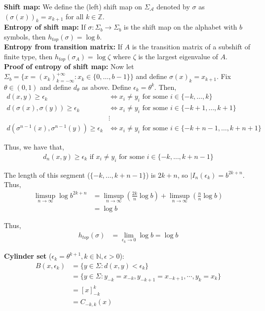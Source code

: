 \documentclass[12pt]{article}
\begin{document}
\textbf{Shift map:} We define the (left) shift map on $\Sigma_{\mathcal{A}}$ denoted by $\sigma$ as $(\sigma(x))_k = x_{k+1}$ for all $k \in \mathbb{Z}$.\\

\textbf{Entropy of shift map:} If $\sigma: \Sigma_b \to \Sigma_b$ is the shift map on the alphabet with $b$ symbols, then $h_{top}(\sigma) = \log b$.\\

\textbf{Entropy from transition matrix:} If $A$ is the transition matrix of a subshift of finite type, then $h_{top}(\sigma_A) = \log \zeta$ where $\zeta$ is the largest eigenvalue of $A$.\\

\textbf{Proof of entropy of shift map:} Now let $\Sigma_b = \{x = (x_k)_{k= -\infty}^{+ \infty} : x_k \in \{0, \ldots, b-1\}\}$ and define $\sigma(x)_k = x_{k+1}$. Fix $\theta \in (0, 1)$ and define $d_{\theta}$ as above. Define $\epsilon_k = \theta^k$. Then,
\begin{align*}
d(x, y) \geq \epsilon_k &\iff x_i \neq y_i \text{ for some } i \in \{-k, \ldots, k\}\\
d(\sigma(x), \sigma(y)) \geq \epsilon_k &\iff x_i \neq y_i \text{ for some } i \in \{-k+1, \ldots, k+1\}\\
&\vdots\\
d(\sigma^{n-1}(x), \sigma^{n-1}(y)) \geq \epsilon_k &\iff x_i \neq y_i \text{ for some } i \in \{-k+n-1, \ldots, k+n+1\}
\end{align*}

Thus, we have that,
\begin{align*}
d_n(x, y) \geq \epsilon_k \text{ if } x_i \neq y_i \text{ for some } i \in \{-k, \ldots, k+n-1\}
\end{align*}

The length of this segment ($\{-k, \ldots, k+n-1\}$) is $2k + n$, so $|I_n(\epsilon_k) = b^{2k+n}$. Thus,
\begin{align*}
\limsup_{n \to \infty} \log b^{2k+n} &= \limsup_{n \to \infty} \left( \frac{2k}{n} \log b \right) + \limsup_{n \to \infty} \left(\frac{n}{n} \log b \right)\\
&= \log b
\end{align*}

Thus,
\begin{align*}
h_{top}(\sigma) &= \lim_{\epsilon_k \to 0} \log b = \log b
\end{align*}

\textbf{Cylinder set} ($\epsilon_k = \theta^{k+1}, k \in \mathbb{N}, \epsilon > 0$):
\begin{align*}
B(x, \epsilon_k) &= \{y \in \Sigma : d(x, y) < \epsilon_k\}\\
&= \{y \in \Sigma: y_{-k} = x_{-k}, y_{-k+1} = x_{-k+1}, \cdots, y_{k} = x_{k}\}\\
&= [x]_{-k}^k\\
&= C_{-k, k}(x)
\end{align*}
\end{document}
